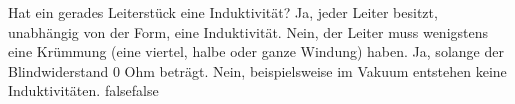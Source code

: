     {Hat ein gerades Leiterstück eine Induktivität?}
    {Ja, jeder Leiter besitzt, unabhängig von der Form, eine Induktivität.}
    {Nein, der Leiter muss wenigstens eine Krümmung (eine viertel, halbe oder ganze Windung) haben.}
    {Ja, solange der Blindwiderstand 0 Ohm beträgt.}
    {Nein, beispielsweise im Vakuum entstehen keine Induktivitäten.}
    {false}{false}